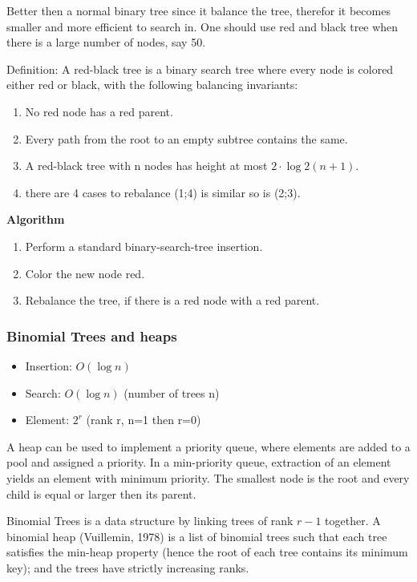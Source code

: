 \begin{multicols}{2}
Better then a normal binary tree since it balance the tree,
therefor it becomes smaller and more efficient to search in.
One should use red and black tree when there is a large number of nodes, say 50.

Definition: A red-black tree is a binary search tree where every node is
colored either red or black, with the following balancing invariants: 

\begin{enumerate}
\item  No red node has a red parent.
\item  Every path from the root to an empty subtree contains the same.
\item  A red-black tree with n nodes has height at most $2\cdot\log{2}(n+1)$.
\item  there are 4 cases to rebalance (1;4) is similar so is (2;3).
\end{enumerate}

\noindent\textbf{Algorithm}
\begin{enumerate}
\item  Perform a standard binary-search-tree insertion.
\item  Color the new node red.
\item  Rebalance the tree, if there is a red node with a red parent.
\end{enumerate}

\subsubsection{Binomial Trees and heaps}
\begin{itemize}
  \item Insertion: $O(\log{n})$
  \item Search: $O(\log{n})$  (number of trees n)
  \item Element: $2^r$  (rank r, n=1 then r=0)
\end{itemize}

A heap can be used to implement a priority queue, where elements are
added to a pool and assigned a priority. In a min-priority queue,
extraction of an element yields an element with minimum priority.
The smallest node is the root and every child is equal or larger then
its parent.

Binomial Trees is a data structure by linking trees of rank $r-1$ together.
A binomial heap (Vuillemin, 1978) is a list of binomial trees such that
each tree satisfies the min-heap property (hence the root of each tree contains its minimum key);
and the trees have strictly increasing ranks. \newline


\end{multicols}
